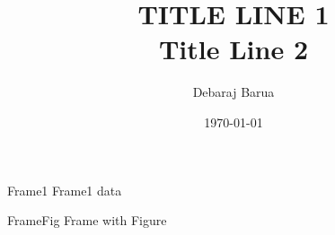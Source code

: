 \documentclass{beamer}
\author{Debaraj Barua}
\date{\today}
\begin{document}
\title{%
		TITLE LINE 1\\
		\large Title Line 2
	   	}
\maketitle
	
	
\begin{frame}{Frame1}
Frame1 data
\end{frame}
\begin{frame}{FrameFig}
Frame with Figure
\end{frame}
\end{document}
